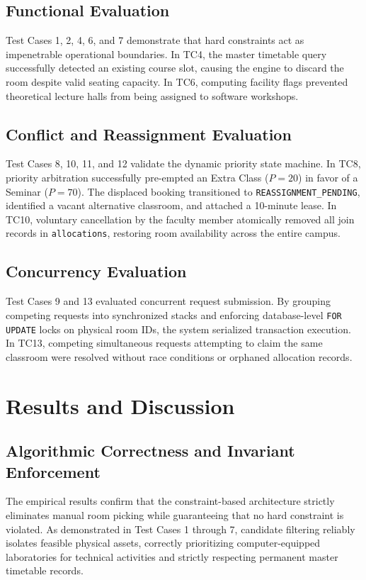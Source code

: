 \documentclass[conference]{IEEEtran}
\begin{document}
\subsection{Functional Evaluation}
Test Cases 1, 2, 4, 6, and 7 demonstrate that hard constraints act as impenetrable operational boundaries. In TC4, the master timetable query successfully detected an existing course slot, causing the engine to discard the room despite valid seating capacity. In TC6, computing facility flags prevented theoretical lecture halls from being assigned to software workshops.

\subsection{Conflict and Reassignment Evaluation}
Test Cases 8, 10, 11, and 12 validate the dynamic priority state machine. In TC8, priority arbitration successfully pre-empted an Extra Class ($P=20$) in favor of a Seminar ($P=70$). The displaced booking transitioned to \texttt{REASSIGNMENT\_PENDING}, identified a vacant alternative classroom, and attached a 10-minute lease. In TC10, voluntary cancellation by the faculty member atomically removed all join records in \texttt{allocations}, restoring room availability across the entire campus.

\subsection{Concurrency Evaluation}
Test Cases 9 and 13 evaluated concurrent request submission. By grouping competing requests into synchronized stacks and enforcing database-level \texttt{FOR UPDATE} locks on physical room IDs, the system serialized transaction execution. In TC13, competing simultaneous requests attempting to claim the same classroom were resolved without race conditions or orphaned allocation records.

\section{Results and Discussion}

\subsection{Algorithmic Correctness and Invariant Enforcement}
The empirical results confirm that the constraint-based architecture strictly eliminates manual room picking while guaranteeing that no hard constraint is violated. As demonstrated in Test Cases 1 through 7, candidate filtering reliably isolates feasible physical assets, correctly prioritizing computer-equipped laboratories for technical activities and strictly respecting permanent master timetable records.
\end{document}
